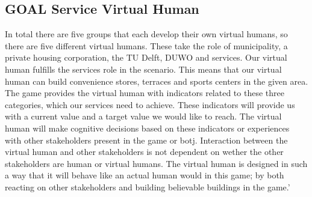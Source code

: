 \subsection{GOAL Service Virtual Human}
In total there are five groups that each develop their own virtual humans, so there are five different virtual humans. These take the role of municipality, a private housing corporation, the TU Delft, DUWO and services. Our virtual human fulfills the services role in the scenario. This means that our virtual human can build convenience stores, terraces and sports centers in the given area. The game provides the virtual human with indicators related to these three categories, which our services need to achieve. These indicators will provide us with a current value and a target value we would like to reach. The virtual human will make cognitive decisions based on these indicators or experiences with other stakeholders present in the game or botj. Interaction between the virtual human and other stakeholders is not dependent on wether the other stakeholders are human or virtual humans. The virtual human is designed in such a way that it will behave like an actual human would in this game; by both reacting on other stakeholders and building believable buildings in the game.'

